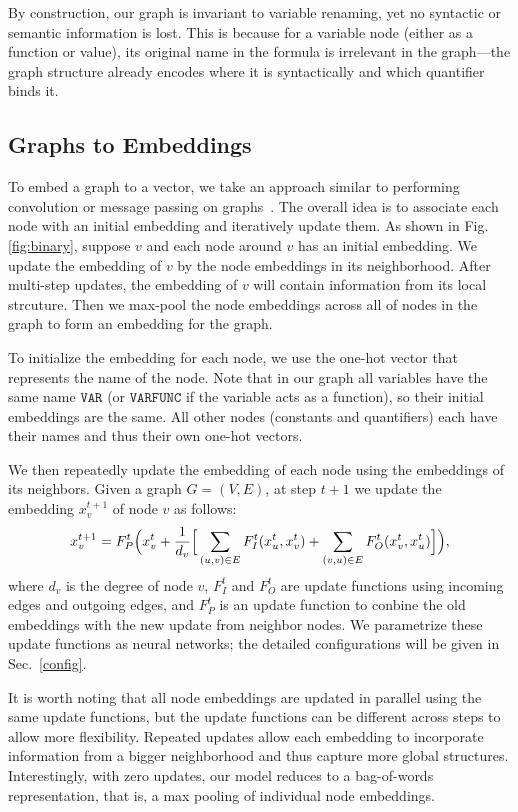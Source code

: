 \documentclass{article}
\begin{document}
By construction, our graph is invariant to variable renaming, yet no
syntactic or semantic information is lost. This is because for a variable node (either as a function or value), its
original name in the formula is irrelevant in the graph---the graph structure already
encodes where it is syntactically and which quantifier binds it.

\subsection{Graphs to Embeddings} \label{sec:emb}

To embed a graph to a vector, we take an approach similar to performing convolution or
message passing on graphs~\cite{duvenaud2015convolutional}. The overall idea is to
associate each node with an initial embedding and iteratively update them. As shown in Fig. \ref{fig:binary},
suppose $ v $  and each node around $ v $ has an initial embedding. We update the embedding of $ v $ by the node
embeddings in its neighborhood. After multi-step updates, the embedding of $v$ will contain information from its local strcuture.
Then we max-pool the node embeddings across all of nodes in the graph to form an embedding for the graph. 

To initialize the embedding for each node, we use the one-hot vector that represents the
name of the node. Note that in our graph all variables have the
same name $\mathtt{VAR}$ (or $\mathtt{VARFUNC}$ if the variable acts as a function), so their initial embeddings are the
 same. All other nodes (constants and quantifiers) each have their
names and thus their own one-hot vectors. 

We then repeatedly update the embedding of each node using the embeddings of its
neighbors. Given a graph $G=(V,E)$, at step $t+1$ we update the embedding $x_v^{t+1}$ of node $v$
as follows: 
\begin{equation} 
\centering 
x_v^{t+1}=F_P^t\Big(x_v^t+\frac{1}{d_v}\Big[ \sum_{(u,v)\in E}F_{I}^t(x_u^t, x_v^t)+\sum_{(v,u)\in
  E}F_{O}^t (x_v^t , x_u^t)\Big] \Big),
\label{eqn:1}
\end{equation} 
where $d_v$ is the degree of node $v$, $F_I^t$ and $F_O^t$ are update functions using incoming
edges and outgoing edges, and $F_P^t$ is an update function to conbine the old embeddings with the new update from neighbor nodes.  We parametrize these update functions as neural networks; the
detailed configurations will be given in Sec.~\ref{config}.

It is worth noting that all node embeddings are updated in parallel using the same update
functions, but the update functions can be different across steps to allow more flexibility. Repeated updates allow each embedding to incorporate information from a bigger neighborhood and thus
capture more global structures. Interestingly, with zero updates, our model reduces to a bag-of-words
representation, that is, a max pooling of individual node embeddings. 
\end{document}
